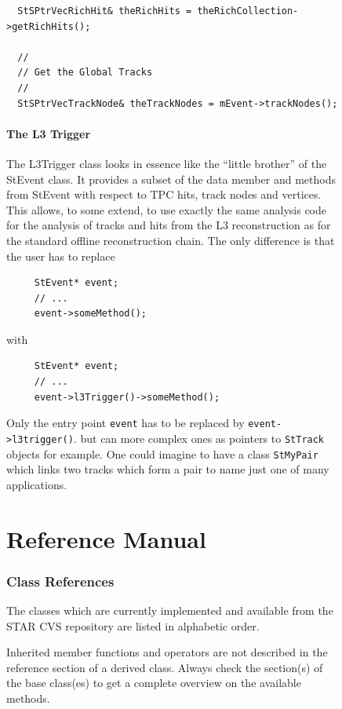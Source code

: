 \documentclass[twoside]{article}
\begin{document}
\begin{figure}[htb]
\begin{center}
\begin{verbatim}
  StSPtrVecRichHit& theRichHits = theRichCollection->getRichHits();

  //
  // Get the Global Tracks
  //
  StSPtrVecTrackNode& theTrackNodes = mEvent->trackNodes();
\end{verbatim}

\subsection{The L3 Trigger}

The L3Trigger class looks in essence like the ``little brother'' of
the StEvent class. It provides a subset of the data member and methods
from StEvent with respect to TPC hits, track nodes and vertices.  This
allows, to some extend, to use exactly the same analysis code for the
analysis of tracks and hits from the L3 reconstruction as for the
standard offline reconstruction chain.
The only difference is that
the user has to replace
\begin{verbatim}
     StEvent* event;
     // ...
     event->someMethod();
\end{verbatim}
with
\begin{verbatim}
     StEvent* event;
     // ...
     event->l3Trigger()->someMethod();
\end{verbatim}
Only the entry point \texttt{event} has to be replaced by \texttt{event->l3trigger()}.
but can more complex ones as pointers to \texttt{StTrack} objects for example.
One could imagine to have a class \texttt{StMyPair} which links two tracks which form
a pair to name just one of many applications. 

\clearpage

%
%
\part{Reference Manual}
\clearpage

\section{Class References} %
The classes which are currently implemented and available from the
STAR CVS repository are listed in alphabetic order.

Inherited member functions and operators are not described in the
reference section of a derived class. Always check the section(s) of
the base class(es) to get a complete overview on the available
methods.


\end{center}
\end{figure}
\end{document}
